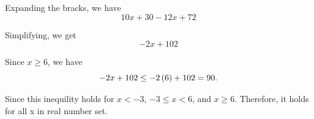 \begin{itemize}
\begin{solution}
\begin{itemize}
        Expanding the bracks, we have
        \begin{equation*}
            10x + 30 - 12x + 72
        \end{equation*}

        Simplifying, we get 
        \begin{equation*}
            -2x + 102
        \end{equation*}

        Since $x \geq 6$, we have 
        \begin{equation*}
            -2x + 102 \leq -2\left(6\right) + 102 = 90. 
        \end{equation*} 

        Since this inequility holds for $x < -3$, $-3 \leq x < 6$, and $x \geq 6$. Therefore, it holds for all x in real number set. 
    \end{itemize}



    \end{solution}

    
\end{itemize}